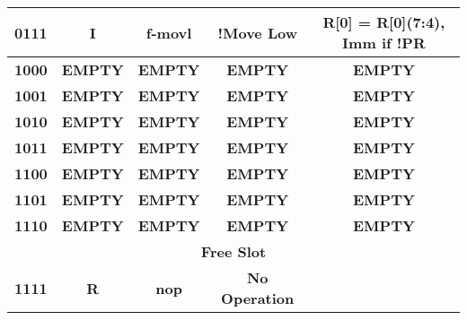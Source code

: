 \documentclass{article}
\begin{document}
\begin{table}[H]
\begin{tabular}{|c|*{4}{c|}}
        \multicolumn{1}{|c|}{\textbf{0111}}   & \multicolumn{1}{c|}{\textbf{I}}     & \multicolumn{1}{c|}{\textbf{f-movl}}    & \multicolumn{1}{c|}{\textbf{!Move Low}}    & \multicolumn{1}{c|}{\textbf{R[0] = {R[0](7:4), Imm} if !PR}} \\ \hline
        \multicolumn{1}{|c|}{\textbf{1000}}   & \multicolumn{1}{c|}{\textbf{EMPTY}} & \multicolumn{1}{c|}{\textbf{EMPTY}}     & \multicolumn{1}{c|}{\textbf{EMPTY}}        & \multicolumn{1}{c|}{\textbf{EMPTY}}                          \\ \hline
        \multicolumn{1}{|c|}{\textbf{1001}}   & \multicolumn{1}{c|}{\textbf{EMPTY}} & \multicolumn{1}{c|}{\textbf{EMPTY}}     & \multicolumn{1}{c|}{\textbf{EMPTY}}        & \multicolumn{1}{c|}{\textbf{EMPTY}}                          \\ \hline
        \multicolumn{1}{|c|}{\textbf{1010}}   & \multicolumn{1}{c|}{\textbf{EMPTY}} & \multicolumn{1}{c|}{\textbf{EMPTY}}     & \multicolumn{1}{c|}{\textbf{EMPTY}}        & \multicolumn{1}{c|}{\textbf{EMPTY}}                          \\ \hline
        \multicolumn{1}{|c|}{\textbf{1011}}   & \multicolumn{1}{c|}{\textbf{EMPTY}} & \multicolumn{1}{c|}{\textbf{EMPTY}}     & \multicolumn{1}{c|}{\textbf{EMPTY}}        & \multicolumn{1}{c|}{\textbf{EMPTY}}                          \\ \hline
        \multicolumn{1}{|c|}{\textbf{1100}}   & \multicolumn{1}{c|}{\textbf{EMPTY}} & \multicolumn{1}{c|}{\textbf{EMPTY}}     & \multicolumn{1}{c|}{\textbf{EMPTY}}        & \multicolumn{1}{c|}{\textbf{EMPTY}}                          \\ \hline
        \multicolumn{1}{|c|}{\textbf{1101}}   & \multicolumn{1}{c|}{\textbf{EMPTY}} & \multicolumn{1}{c|}{\textbf{EMPTY}}     & \multicolumn{1}{c|}{\textbf{EMPTY}}        & \multicolumn{1}{c|}{\textbf{EMPTY}}                          \\ \hline
        \multicolumn{1}{|c|}{\textbf{1110}}   & \multicolumn{1}{c|}{\textbf{EMPTY}} & \multicolumn{1}{c|}{\textbf{EMPTY}}     & \multicolumn{1}{c|}{\textbf{EMPTY}}        & \multicolumn{1}{c|}{\textbf{EMPTY}}                          \\ \hline
        \multicolumn{5}{|c|}{\textbf{Free Slot}}                                                                                                                                                                                          \\ \hline 
        \multicolumn{1}{|c|}{\textbf{1111}}   & \multicolumn{1}{c|}{\textbf{R}}     & \multicolumn{1}{c|}{\textbf{nop}}       & \multicolumn{1}{c|}{\textbf{No Operation}} & \multicolumn{1}{c|}{\textbf{}}                               \\ \hline
      \end{tabular}
    \end{table}
\end{document}

